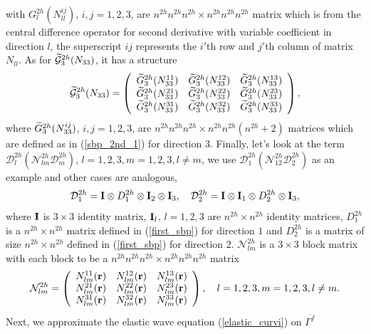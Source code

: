 with $G_l^{2h}(N_{ll}^{ij})$, $i,j = 1,2,3$, are $n^{2h}n^{2h}n^{2h}\times n^{2h}n^{2h}n^{2h}$ matrix which is from the central difference operator for second derivative with variable coefficient in direction $l$, the superscript $ij$ represents the $i'$th row and $j'$th column of matrix $N_{ll}$. As for $\widetilde{\mathcal{G}}_3^{2h}({N}_{33})$, it has a structure
\[ \widetilde{\mathcal{G}}^{2h}_3({N}_{33}) = \left(\begin{array}{ccc}
\widetilde{G}_3^{2h}(N_{33}^{11}) & \widetilde{G}_3^{2h}(N_{33}^{12})  & \widetilde{G}_3^{2h}(N_{33}^{13}) \\
\widetilde{G}_3^{2h}(N_{33}^{21}) & \widetilde{G}_3^{2h}(N_{33}^{22})  & \widetilde{G}_3^{2h}(N_{33}^{23}) \\
\widetilde{G}_3^{2h}(N_{33}^{31}) & \widetilde{G}_3^{2h}(N_{33}^{32})  & \widetilde{G}_3^{2h}(N_{33}^{33}) \end{array}\right),\]
where $\widetilde{G}_3^{2h}(N_{33}^{ij})$, $i,j = 1,2,3$, are $n^{2h}n^{2h}n^{2h}\times n^{2h}n^{2h}(n^{2h}+2)$ matrices which are defined as in (\ref{sbp_2nd_1}) for direction $3$. Finally, let's look at the term $\mathcal{D}_l^{2h}(\mathcal{N}_{lm}^{2h}\mathcal{D}_m^{2h})$, $l = 1,2,3, m = 1,2,3, l\neq m$, we use $\mathcal{D}_1^{2h}(\mathcal{N}_{12}^{2h}\mathcal{D}_2^{2h})$ as an example and other cases are analogous,
\[\mathcal{D}_1^{2h} = {\bf I}\otimes D_1^{2h} \otimes {\bf I}_2 \otimes {\bf I}_3,\ \ \ \mathcal{D}_2^{2h} ={\bf I}\otimes {\bf I}_1\otimes D_2^{2h}\otimes {\bf I}_3,\]
where ${\bf I}$ is $3\times3$ identity matrix, ${\bf I}_l$, $l = 1,2,3$ are $n^{2h}\times n^{2h}$ identity matrices, $D_1^{2h}$ is a $n^{2h}\times n^{2h}$ matrix defined in (\ref{first_sbp}) for direction $1$ and $D_2^{2h}$ is a matrix of size $n^{2h}\times n^{2h}$ defined in (\ref{first_sbp}) for direction $2$. $\mathcal{N}_{lm}^{2h}$ is a $3\times3$ block matrix with each block to be a $n^{2h}n^{2h}n^{2h}\times n^{2h}n^{2h}n^{2h}$ matrix
\begin{align}\label{Nij}
\mathcal{N}_{lm}^{2h}= \left(\begin{array}{ccc}
N_{lm}^{11}({\bf r})&N_{lm}^{12}({\bf r}) & N_{lm}^{13}({\bf r})\\
N_{lm}^{21}({\bf r})& N_{lm}^{22}({\bf r}) &  N_{lm}^{23}({\bf r})\\
N_{lm}^{31}({\bf r})& N_{lm}^{32}({\bf r}) &  N_{lm}^{33}({\bf r})\\ \end{array}\right),\ \ \ l = 1,2,3, m = 1,2,3, l\neq m.
\end{align}
Next, we approximate the elastic wave equation (\ref{elastic_curvi}) on $\overline{\Gamma^f}$ 
